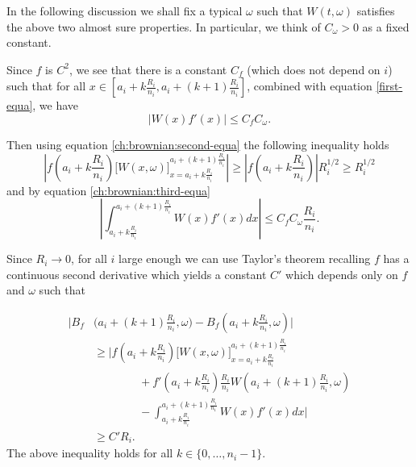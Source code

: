 	In the following discussion we shall fix a typical $\omega$ such that $W(t,\omega)$ satisfies the above two almost sure properties. In particular, we think of $C_\omega>0$ as a fixed constant. 
	
	Since $f$ is $C^2$, we see that there is a constant $C_f$ (which does not depend on $i$) such that for all $x\in \left[{a_i+k\frac{R_i}{n_i}},{a_i+(k+1)\frac{R_i}{n_i}}\right]$, combined with equation \eqref{first-equa}, we have
	\begin{equation}
	\lvert W(x)f'(x)\rvert \leq C_f C_\omega. \label{ch:brownian:third-equa}
	\end{equation}
	
	Then using equation \eqref{ch:brownian:second-equa} the following inequality holds
	\begin{equation}
	\left| f\left(a_i+k\frac{R_i}{n_i}\right)\bigg[W(x,\omega)\bigg]_{x=a_i+k\frac{R_i}{n_i}}^{a_i+(k+1)\frac{R_i}{n_i}} \right| \geq \left| f\left(a_i+k\frac{R_i}{n_i}\right) \right| R_i^{1/2}\geq R_i^{1/2}\label{ch:brownian:ineq-one}    
	\end{equation}
	and by equation \eqref{ch:brownian:third-equa}
	\[
	\left\vert\int_{a_i+k\frac{R_i}{n_i}}^{a_i+(k+1)\frac{R_i}{n_i}} W(x)f'(x)dx \right\vert\leq C_fC_\omega\frac{R_i}{n_i}.
	\]
	
	Since $R_i\to 0$, for all $i$ large enough we can use Taylor's theorem recalling $f$ has a continuous second derivative which yields a constant $C'$ which depends only on $f$ and $\omega$ such that
	
	\begin{align}\label{ch:brownian:main-equa}
	    \bigg\vert B_f&\bigg(a_i+(k+1)\frac{R_i}{n_i},\omega\bigg)-B_f\left(a_i+k\frac{R_i}{n_i},\omega\right)\bigg\vert \\
	    &\ge \bigg\vert f\left(a_i + k \frac{R_i}{n_i}\right) \bigg[W(x,\omega) \bigg]_{x=a_i+k\frac{R_i}{n_i}}^{a_i+(k+1)\frac{R_i}{n_i}}\nonumber\\
	    &\qquad \qquad + f'\left(a_i + k\frac{R_i}{n_i}\right) \frac{R_i}{n_i} W\left(a_i +(k+1) \frac{R_i}{n_i},\omega\right) \nonumber\\ 
	    &\qquad \qquad- \int_{a_i+k \frac{R_i}{n_i}}^{a_i+(k+1)\frac{R_i}{n_1}}W(x)f'(x)dx \bigg\vert  \nonumber \\
	    & \ge C'R_i. \nonumber
	\end{align}
	The above inequality holds for all $k\in\{0,\dots,n_i-1\}$. 
	
